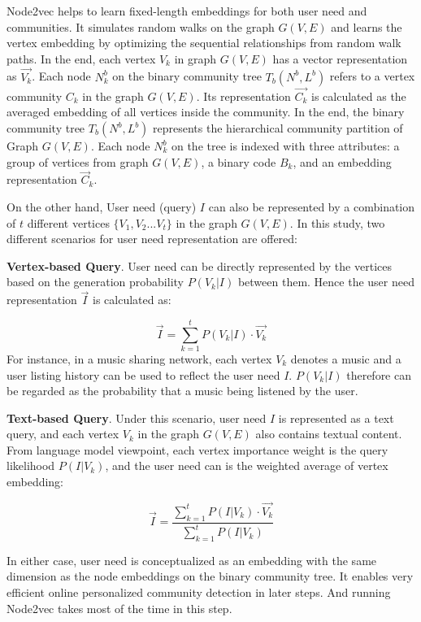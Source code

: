 Node2vec \cite{grover2016node2vec} helps to learn fixed-length embeddings for both user need and communities. It simulates random walks on the graph $G(V,E)$ and learns the vertex embedding by optimizing the sequential relationships from random walk paths. In the end, each vertex $V_{k}$ in graph $G(V,E)$ has a vector representation as $\vec{V_k}$. Each node $N_{k}^{b}$ on the binary community tree \textit{$T_{b}(N^{b},L^{b})$} refers to a vertex community $C_{k}$ in the graph $G(V,E)$. Its representation $\vec{C_{k}}$ is calculated as the averaged embedding of all vertices inside the community. In the end, the binary community tree \textit{$T_{b}(N^{b},L^{b})$} represents the hierarchical community partition of Graph $G(V,E)$. Each node \textit{$N_{k}^{b}$} on the tree is indexed with three attributes: a group of vertices from graph $G(V,E)$, a binary code \textit{$B_{k}$}, and an embedding representation \textit{$\vec{C}_{k}$}.

On the other hand, User need (query) $I$ can also be represented by a combination of $t$ different vertices $\{V_1, V_2... V_t\}$ in the graph $G(V,E)$. In this study, two different scenarios for user need representation are offered:

\textbf{Vertex-based Query}. User need can be directly represented by the vertices based on the generation probability $P(V_k|I)$ between them. Hence the user need representation $\vec{I}$ is calculated as:

\begin{equation}
\vec{I} = \sum_{k=1}^{t} P(V_k|I) \cdot \vec{V_k} 
\end{equation} 
For instance, in a music sharing network, each vertex $V_k$ denotes a music and a user listing history can be used to reflect the user need $I$. $P(V_k|I)$ therefore can be regarded as the probability that a music being listened by the user. 

\textbf{Text-based Query}. Under this scenario, user need $I$ is represented as a text query, and each vertex $V_{k}$ in the graph $G(V,E)$ also contains textual content. From language model viewpoint, each vertex importance weight is the query likelihood $P(I|V_k)$, and the user need can is the weighted average of vertex embedding: 

\begin{equation}
\vec{I} = \frac{\sum_{k=1}^{t} P(I|V_k) \cdot \vec{V_k}}{\sum_{k=1}^{t} P(I|V_k)}
\end{equation}

In either case, user need is conceptualized as an embedding with the same dimension as the node embeddings on the binary community tree. It enables very efficient online personalized community detection in later steps. And running Node2vec takes most of the time in this step.   

